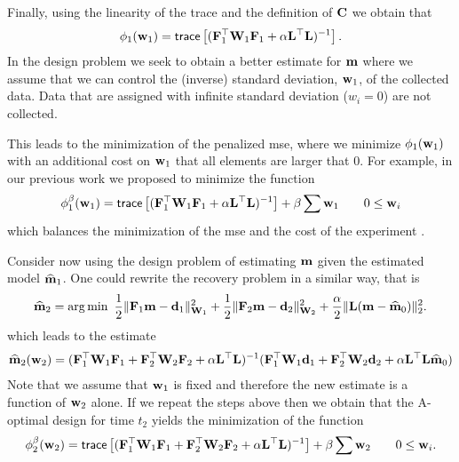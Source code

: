 \documentclass[11pt]{article}
\begin{document}
Finally, using the linearity of the trace and the definition of ${\bf{C}}$ we obtain that
\begin{align}
\label{design1}
\phi_{1}({\bf{w}}_1 ) =  {\sf trace} \left[   ({\bf{F}}_{1}^{\top}{\bf{W}}_{1}{\bf{F}}_{1}   + 
 {\alpha} {\bf{L}}^{\top}{\bf{L}})^{-1} \right]. 
\end{align}
In the design problem we seek to obtain a better estimate for ${\bf{m}}$ where we assume
that we can control the (inverse) standard deviation, ${\bf{w}}_{1}$, of the collected data.
Data that are assigned with infinite standard deviation ($w_i = 0$) are not collected.
 
 This leads to the minimization of the penalized mse, where 
we minimize $\phi_{1}({\bf{w}}_{1})$ with an additional cost on ${\bf{w}}_{1}$ that all elements are larger that $0$.
 For example, in our
previous work we proposed to minimize the function
\begin{align}
\label{designp1}
\phi_{1}^{\beta}({\bf{w}}_1 ) =  {\sf trace} \left[   ({\bf{F}}_{1}^{\top}{\bf{W}}_{1}{\bf{F}}_{1}   + 
 {\alpha} {\bf{L}}^{\top}{\bf{L}})^{-1} \right]  + \beta \sum {\bf{w}}_{1} \quad \quad 0 \le {\bf{w}}_i 
\end{align}
which balances the minimization of the mse and the cost of the experiment \cite{Haber2008}.


\bigskip

Consider now using the design problem of estimating ${\bf{m}}$ given the estimated model $\widehat {{\bf{m}}}_{1}$.
One could rewrite the recovery problem in a similar way,
that is
\begin{align}
\label{mest2}
{\widehat{{\bf{m}}}}_{2} = {\rm arg}\min\ \frac12 \| {\bf{F}}_{1} {\bf{m}} - {\bf{d}}_{1}\|^{2}_{{\bf{W}}_{1}} + \frac12 \| {\bf{F}}_{2} {\bf{m}} - {\bf{d}}_{2}\|^{2}_{{\bf{W}}_{2}}  + {\frac {\alpha} 2}
\|{\bf{L}} ({\bf{m}} -{\widehat{{\bf{m}}}}_{0}) \|^{2}_2. 
\end{align}
which leads to the estimate
\begin{align}
{\widehat{{\bf{m}}}}_{2}({\bf{w}}_{2}) = ({\bf{F}}_{1}^{\top} {\bf{W}}_{1}{\bf{F}}_{1} +
{\bf{F}}_{2}^{\top} {\bf{W}}_{2}{\bf{F}}_{2} + \alpha {\bf{L}}^{\top}{\bf{L}})^{-1} ({\bf{F}}_{1}^{\top} {\bf{W}}_{1} {\bf{d}}_{1} +{\bf{F}}_{2}^{\top} {\bf{W}}_{2} {\bf{d}}_{2}
+ \alpha {\bf{L}}^{\top}{\bf{L}} {\widehat{{\bf{m}}}}_{0})
\end{align}
Note that we assume that ${\bf{w}}_{1}$ is fixed and therefore the new estimate is a function of ${\bf{w}}_{2}$ alone.
If we repeat the steps above then we obtain that the A-optimal design for time $t_{2}$ yields the minimization of
the function
\begin{align}
\label{design2na}
\phi_{2}^{\beta}({\bf{w}}_{2} ) =  {\sf trace} \left[   ({\bf{F}}_{1}^{\top}{\bf{W}}_{1}{\bf{F}}_{1}   + {\bf{F}}_{2}^{\top}{\bf{W}}_{2}{\bf{F}}_{2} +
\alpha {\bf{L}}^{\top}{\bf{L}})^{-1} \right] + \beta \sum {\bf{w}}_{2}\quad \quad 0 \le {\bf{w}}_i . 
\end{align}
\end{document}
